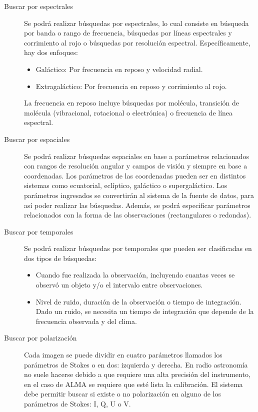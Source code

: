 \begin{description}
	\item[Buscar por  espectrales] Se podrá realizar búsquedas por  espectrales, lo cual consiste en búsqueda por banda o rango de frecuencia, búsquedas por líneas espectrales y corrimiento al rojo o búsquedas por resolución espectral. Específicamente, hay dos enfoques:
		\begin{itemize}
			\item Galáctico: Por frecuencia en reposo y velocidad radial.
			\item Extragaláctico: Por frecuencia en reposo y corrimiento al rojo.
		\end{itemize}
		La frecuencia en reposo incluye búsquedas por mol\'ecula, transición de mol\'ecula (vibracional, rotacional o electrónica) o frecuencia de línea espectral.
	\item[Buscar por  espaciales] Se podrá realizar búsquedas espaciales en base a parámetros relacionados con rangos de resolución angular y campos de visión y siempre en base a coordenadas. Los parámetros de las coordenadas pueden ser en distintos sistemas como ecuatorial, eclíptico, galáctico o supergaláctico. Los parámetros ingresados se convertirán al sistema de la fuente de datos, para así poder realizar las búsquedas. Además, se podrá especificar parámetros relacionados con la forma de las observaciones (rectangulares o redondas).
	\item[Buscar por  temporales] Se podrá realizar búsquedas por  temporales que pueden ser clasificadas en dos tipos de	búsquedas:
		\begin{itemize}
			\item Cuando fue realizada la observación, incluyendo cuantas veces se observó un objeto y/o el	intervalo entre observaciones.
			\item Nivel de ruido, duración de la observación o tiempo de integración. Dado un ruido, se necesita un tiempo de integración que depende de la frecuencia observada y del clima.
		\end{itemize}
	\item[Buscar por polarización] Cada imagen se puede dividir en cuatro parámetros llamados los parámetros de Stokes o en dos: izquierda y derecha. En radio astronomía no suele hacerse debido a que requiere una alta precisión	del instrumento, en el caso de ALMA se requiere que est\'e lista la calibración. El sistema debe permitir buscar si existe o no polarización en alguno de los parámetros de Stokes: I, Q, U o V.

\end{description}
